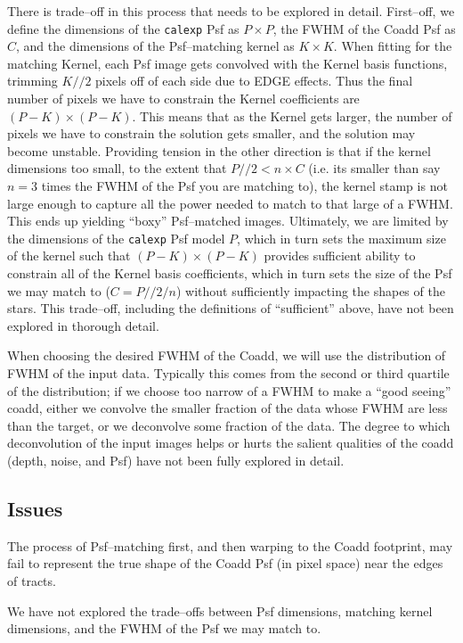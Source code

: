 \documentclass[12pt]{article}
\begin{document}
There is trade--off in this process that needs to be explored in
detail.  First--off, we define the dimensions of the {\tt calexp} Psf
as $P \times P$, the FWHM of the Coadd Psf as $C$, and the dimensions
of the Psf--matching kernel as $K \times K$.  When fitting for the
matching Kernel, each Psf image gets convolved with the Kernel basis
functions, trimming $K//2$ pixels off of each side due to EDGE
effects.  Thus the final number of pixels we have to constrain the
Kernel coefficients are $(P-K) \times (P-K)$.  This means that as the
Kernel gets larger, the number of pixels we have to constrain the
solution gets smaller, and the solution may become unstable.
Providing tension in the other direction is that if the kernel
dimensions too small, to the extent that $P//2 < n \times C$ (i.e. its
smaller than say $n=3$ times the FWHM of the Psf you are matching to),
the kernel stamp is not large enough to capture all the power needed
to match to that large of a FWHM.  This ends up yielding ``boxy''
Psf--matched images.  Ultimately, we are limited by the dimensions of
the {\tt calexp} Psf model $P$, which in turn sets the maximum size of
the kernel such that $(P-K) \times (P-K)$ provides sufficient ability
to constrain all of the Kernel basis coefficients, which in turn sets
the size of the Psf we may match to ($C = P//2 / n$) without
sufficiently impacting the shapes of the stars.  This trade--off,
including the definitions of ``sufficient'' above, have not been
explored in thorough detail.

When choosing the desired FWHM of the Coadd, we will use the
distribution of FWHM of the input data.  Typically this comes from the
second or third quartile of the distribution; if we choose too narrow
of a FWHM to make a ``good seeing'' coadd, either we convolve the
smaller fraction of the data whose FWHM are less than the target, or
we deconvolve some fraction of the data.  The degree to which
deconvolution of the input images helps or hurts the salient qualities
of the coadd (depth, noise, and Psf) have not been fully explored in
detail.

\subsection{Issues}

The process of Psf--matching first, and then warping to the Coadd
footprint, may fail to represent the true shape of the Coadd Psf (in
pixel space) near the edges of tracts.

We have not explored the trade--offs between Psf dimensions, matching
kernel dimensions, and the FWHM of the Psf we may match to.
\end{document}
